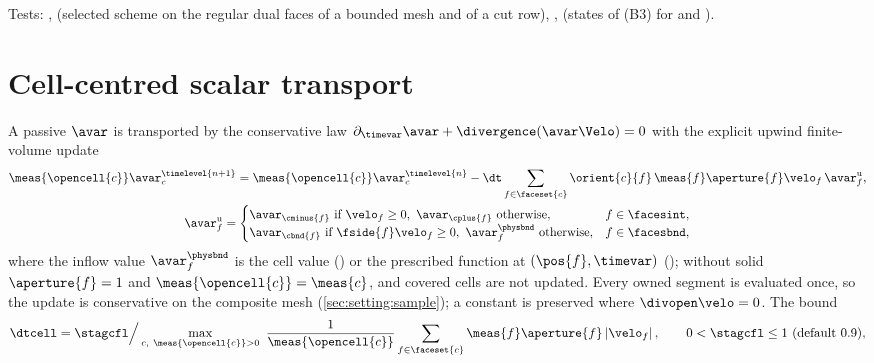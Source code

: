 \begin{implnote}
Tests: ,
(selected scheme on the regular dual faces of a bounded mesh and of a cut row),
,
(states of (B3) for  and ).
\end{implnote}

\section{Cell-centred scalar transport}\label{sec:momentum:cell-scalar}
A passive  $\avar$ is transported by the conservative law
$\partial_\timevar\avar+\divergence(\avar\Velo)=0$ with the explicit upwind
finite-volume update
\begin{equation}\label{eq:momentum:cell-scalar}
  \begin{gathered}
  \meas{\opencell{c}}\avar^{\timelevel{n+1}}_c=\meas{\opencell{c}}\avar^{\timelevel{n}}_c
  -\dt\sum_{f\in\faceset{c}}\orient{c}{f}\,\meas{f}\aperture{f}\velo_f\,\avar^{\mathrm{u}}_f,\\
  \avar^{\mathrm{u}}_f=\begin{cases}
    \avar_{\cminus{f}}\text{ if }\velo_f\ge0,\ \avar_{\cplus{f}}\text{ otherwise}, & f\in\facesint,\\
    \avar_{\cbnd{f}}\text{ if }\fside{f}\velo_f\ge0,\ \avar^{\physbnd}_f\text{ otherwise}, & f\in\facesbnd,
  \end{cases}
  \end{gathered}
\end{equation}
where the inflow value $\avar^{\physbnd}_f$ is the cell value
() or the prescribed function at $(\pos{f},\timevar)$
(); without solid $\aperture{f}=1$ and
$\meas{\opencell{c}}=\meas{c}$, and covered cells are not updated. Every owned
segment is evaluated once, so the update is conservative on the composite
mesh (\cref{sec:setting:sample}); a constant is preserved where
$\divopen\velo=0$. The bound
\begin{equation}\label{eq:momentum:cell-cfl}
  \dtcell=\stagcfl\Big/\max_{c,\ \meas{\opencell{c}}>0}\ \frac{1}{\meas{\opencell{c}}}\sum_{f\in\faceset{c}}\meas{f}\aperture{f}\abs{\velo_f},
  \qquad 0<\stagcfl\le1\ (\text{default }0.9),
\end{equation}
